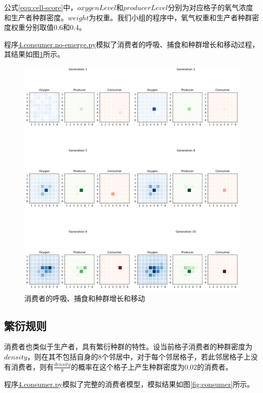 \documentclass{ctexart}
\begin{document}
公式\ref{equ:cell-score}中，$oxygenLevel$和$producerLevel$分别为对应格子的氧气浓度和生产者种群密度。$weight$为权重。我们小组的程序中，氧气权重和生产者种群密度权重分别取值0.6和0.4。

程序\underline{4.consumer.no-emerge.py}模拟了消费者的呼吸、捕食和种群增长和移动过程，其结果如图\ref{fig:consumer-move}所示。

\begin{figure}[ht]
  \centering
  \includegraphics[width=\textwidth]{consumer-move.png}
  \caption{消费者的呼吸、捕食和种群增长和移动}
  \label{fig:consumer-move}
\end{figure}

\subsection{繁衍规则}

消费者也类似于生产者，具有繁衍种群的特性。设当前格子消费者的种群密度为$density$，则在其不包括自身的8个邻居中，对于每个邻居格子，若此邻居格子上没有消费者，则有$\frac{density}{8}$的概率在这个格子上产生种群密度为0.02的消费者。

程序\underline{4.consumer.py}模拟了完整的消费者模型，模拟结果如图\ref{fig:consumer}所示。
\end{document}
